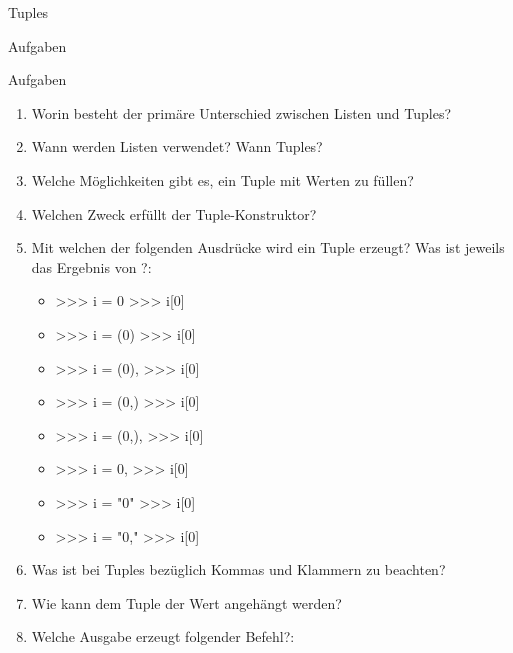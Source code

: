 \begin{subsection}{Tuples}
        \begin{subsubsection}{Aufgaben}
             \begin{frame}{Aufgaben}
                \begin{enumerate}
                    \item Worin besteht der primäre Unterschied zwischen Listen und Tuples?
                    \item Wann werden Listen verwendet? Wann Tuples?
                    \item Welche Möglichkeiten gibt es, ein Tuple mit Werten zu füllen?
                    \item Welchen Zweck erfüllt der Tuple-Konstruktor?
                    \item Mit welchen der folgenden Ausdrücke wird ein Tuple erzeugt? Was ist jeweils das Ergebnis von ?:
                        \begin{itemize}
                            \item
\begin{pyconcode}
>>> i = 0
>>> i[0]
\end{pyconcode}    
                            \item
\begin{pyconcode}
>>> i = (0)
>>> i[0]
\end{pyconcode}  
                            \item
\begin{pyconcode}
>>> i = (0),
>>> i[0]
\end{pyconcode}   
                            \item
\begin{pyconcode}
>>> i = (0,)
>>> i[0]
\end{pyconcode}   
                            \item
\begin{pyconcode}
>>> i = (0,),
>>> i[0]
\end{pyconcode}   
                            \item
\begin{pyconcode}
>>> i = 0,
>>> i[0]
\end{pyconcode}    
                            \item
\begin{pyconcode}
>>> i = "0"
>>> i[0]
\end{pyconcode}   
                           \item
\begin{pyconcode}
>>> i = "0,"
>>> i[0]
\end{pyconcode}   
                        \end{itemize}
                    \item Was ist bei Tuples bezüglich Kommas und Klammern zu beachten?
                    \item Wie kann dem Tuple  der Wert  angehängt werden?
                    \item Welche Ausgabe erzeugt folgender Befehl?:


\end{enumerate}
\end{frame}
\end{subsubsection}
\end{subsection}
